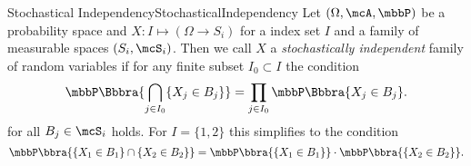 \begin{mdef}{Stochastical Independency}{StochasticalIndependency}
    Let $(\Omega,\mcA,\mbbP)$ be a probability space and $X:I\mapsto (\Omega\to S_i)$ for a index set $I$ and a family of measurable spaces $(S_i,\mcS_i)$. Then we call $X$ a \emph{stochastically independent} family of random variables if for any finite subset $I_0\subset I$ the condition
    \[
        \mbbP\Bbbra{
            \bigcap_{j\in I_0}\{X_j\in B_j\}
        } = \prod_{j\in I_0}\mbbP\Bbbra{X_j\in B_j}.
    \]
    for all $B_j\in\mcS_i$ holds. For $I = \{1,2\}$ this simplifies to the condition
    \[
        \mbbP\bbra{\{X_1\in B_1\}\cap\{X_2\in B_2\}} = \mbbP\bbra{\{X_1\in B_1\}}\cdot\mbbP\bbra{\{X_2\in B_2\}}.
    \]
\end{mdef}